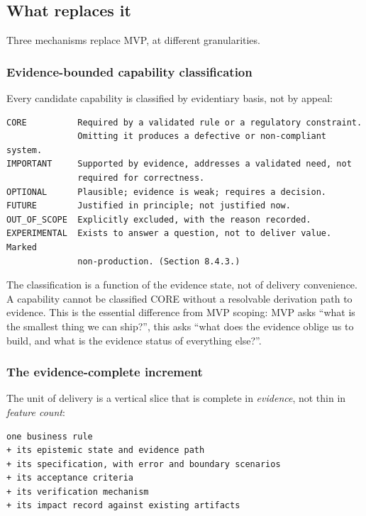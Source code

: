 \documentclass[11pt,a4paper]{article}
\begin{document}
\subsection{What replaces it}

Three mechanisms replace MVP, at different granularities.

\subsubsection{Evidence-bounded capability classification}

Every candidate capability is classified by evidentiary basis, not by appeal:

\begin{Verbatim}[fontsize=\footnotesize,breaklines=true,breakanywhere=true,breakautoindent=false,samepage=false]
CORE          Required by a validated rule or a regulatory constraint.
              Omitting it produces a defective or non-compliant system.
IMPORTANT     Supported by evidence, addresses a validated need, not
              required for correctness.
OPTIONAL      Plausible; evidence is weak; requires a decision.
FUTURE        Justified in principle; not justified now.
OUT_OF_SCOPE  Explicitly excluded, with the reason recorded.
EXPERIMENTAL  Exists to answer a question, not to deliver value. Marked
              non-production. (Section 8.4.3.)
\end{Verbatim}

The classification is a function of the evidence state, not of delivery convenience. A capability cannot be classified CORE without a resolvable derivation path to evidence. This is the essential difference from MVP scoping: MVP asks ``what is the smallest thing we can ship?'', this asks ``what does the evidence oblige us to build, and what is the evidence status of everything else?''.

\subsubsection{The evidence-complete increment}

The unit of delivery is a vertical slice that is complete in \emph{evidence}, not thin in \emph{feature count}:

\begin{Verbatim}[fontsize=\footnotesize,breaklines=true,breakanywhere=true,breakautoindent=false,samepage=false]
  one business rule
+ its epistemic state and evidence path
+ its specification, with error and boundary scenarios
+ its acceptance criteria
+ its verification mechanism
+ its impact record against existing artifacts
\end{Verbatim}
\end{document}
